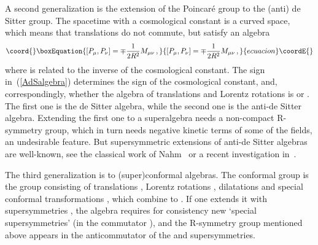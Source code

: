 \documentclass[a4paper,11pt,twoside]{article}
\providecommand{\Red}[1]{#1}
\providecommand{\OliveGreen}[1]{#1}
\providecommand{\Blue}[1]{#1}
\providecommand{\SO}{\mathop{\rm SO}}
\begin{document}
A second generalization is the extension of the Poincar{\'e} group to the
(anti) de Sitter group. The spacetime with a cosmological constant is a
curved space, which means that translations do not commute, but satisfy
an algebra
\begin{equation}\coord{}\boxEquation{
  \left[ \OliveGreen{P_\mu },\OliveGreen{P_\nu }\right] =\mp \frac{1}{2R^2}\OliveGreen{M_{\mu \nu
  }}\,,
 \label{AdSalgebra}
}{
  \left[ \OliveGreen{P_\mu },\OliveGreen{P_\nu }\right] =\mp \frac{1}{2R^2}\OliveGreen{M_{\mu \nu
  }}\,,
 }{ecuacion}\coordE{}\end{equation}
where \coordHE{} is related to the inverse of the cosmological constant. The
sign in~(\ref{AdSalgebra}) determines the sign of the cosmological
constant, and, correspondingly, whether the algebra of translations and
Lorentz rotations is \myHighlight{$\SO(D,1)$}\coordHE{} or \myHighlight{$\SO(D-1,2)$}\coordHE{}. The first one is the de
Sitter algebra, while the second one is the anti-de Sitter algebra.
Extending the first one to a superalgebra needs a non-compact R-symmetry
group, which in turn needs negative kinetic terms of some of the fields,
an undesirable feature. But supersymmetric extensions of anti-de Sitter
algebras are well-known, see the classical work of
Nahm~\cite{Nahm:1978tg} or a recent investigation
in~\cite{D'Auria:2000ec}.

The third generalization is to (super)conformal algebras. The conformal
group is the group consisting of translations \myHighlight{$\Blue{P_\mu}$}\coordHE{}, Lorentz
rotations \myHighlight{$\Blue{M_{\mu \nu }}$}\coordHE{}, dilatations \myHighlight{$\Blue{D}$}\coordHE{} and special
conformal transformations \myHighlight{$\Blue{K_\mu}$}\coordHE{}, which combine to \myHighlight{$\SO(D,2)$}\coordHE{}. If
one extends it with supersymmetries \myHighlight{$\Red{Q^i}$}\coordHE{}, the algebra requires for
consistency new `special supersymmetries' \myHighlight{$\Red{S^i}$}\coordHE{} (in the commutator
\myHighlight{$[Q,K]$}\coordHE{}), and the R-symmetry group mentioned above appears in the
anticommutator of the \myHighlight{$\Red{Q}$}\coordHE{} and \myHighlight{$\Red{S}$}\coordHE{} supersymmetries.
\end{document}
